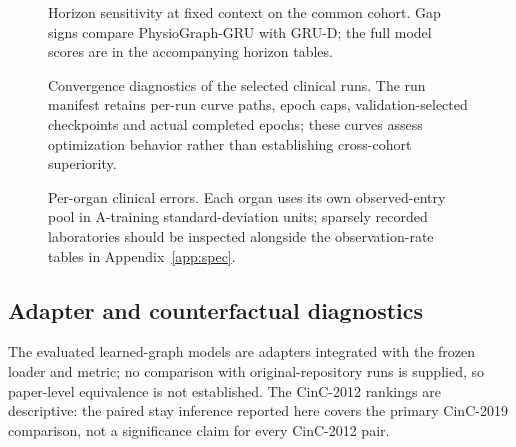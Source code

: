 \begin{figure}[htbp]
\centering{}
\caption{Horizon sensitivity at fixed context on the common cohort. Gap signs compare PhysioGraph-GRU with GRU-D; the full model scores are in the accompanying horizon tables.}\label{fig:horizon}
\end{figure}
\begin{figure}[htbp]
\centering{}
\caption{Convergence diagnostics of the selected clinical runs. The run manifest retains per-run curve paths, epoch caps, validation-selected checkpoints and actual completed epochs; these curves assess optimization behavior rather than establishing cross-cohort superiority.}\label{fig:convergence}
\end{figure}
\clearpage
\begin{figure}[htbp]
\centering{}
\caption{Per-organ clinical errors. Each organ uses its own observed-entry pool in A-training standard-deviation units; sparsely recorded laboratories should be inspected alongside the observation-rate tables in Appendix~\ref{app:spec}.}\label{fig:perorgan}
\end{figure}
\subsection{Adapter and counterfactual diagnostics}
The evaluated learned-graph models are adapters integrated with the frozen loader and metric; no comparison with original-repository runs is supplied, so paper-level equivalence is not established. The CinC-2012 rankings are descriptive: the paired stay inference reported here covers the primary CinC-2019 comparison, not a significance claim for every CinC-2012 pair.

